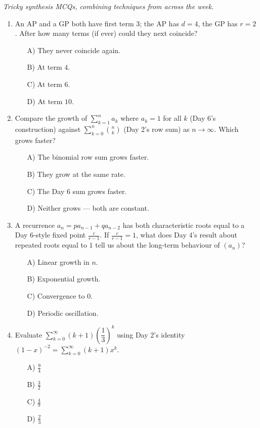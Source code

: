 \documentclass[11pt,a4paper]{article}
\begin{document}
\noindent\textit{Tricky synthesis MCQs, combining techniques from across the week.}

\begin{enumerate}

\item An AP and a GP both have first term $3$; the AP has $d=4$, the GP has $r=2$. After how many terms (if ever) could they next coincide?
\begin{itemize}
\item[A)] They never coincide again.
\item[B)] At term $4$.
\item[C)] At term $6$.
\item[D)] At term $10$.
\end{itemize}

\item Compare the growth of $\sum_{k=1}^na_k$ where $a_k=1$ for all $k$ (Day 6's construction) against $\sum_{k=0}^n\binom nk$ (Day 2's row sum) as $n\to\infty$. Which grows faster?
\begin{itemize}
\item[A)] The binomial row sum grows faster.
\item[B)] They grow at the same rate.
\item[C)] The Day 6 sum grows faster.
\item[D)] Neither grows --- both are constant.
\end{itemize}

\item A recurrence $a_n=pa_{n-1}+qa_{n-2}$ has both characteristic roots equal to a Day 6-style fixed point $\frac c{r-1}$. If $\frac c{r-1}=1$, what does Day 4's result about repeated roots equal to $1$ tell us about the long-term behaviour of $(a_n)$?
\begin{itemize}
\item[A)] Linear growth in $n$.
\item[B)] Exponential growth.
\item[C)] Convergence to $0$.
\item[D)] Periodic oscillation.
\end{itemize}

\item Evaluate $\displaystyle\sum_{k=0}^\infty(k+1)\left(\dfrac13\right)^k$ using Day 2's identity $(1-x)^{-2}=\sum_{k=0}^\infty(k+1)x^k$.
\begin{itemize}
\item[A)] $\tfrac94$
\item[B)] $\tfrac32$
\item[C)] $\tfrac49$
\item[D)] $\tfrac23$
\end{itemize}


\end{enumerate}
\end{document}
